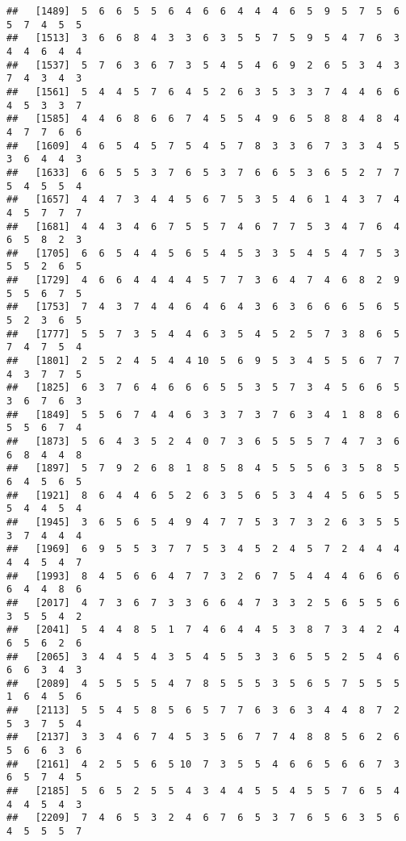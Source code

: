 \documentclass[
]{book}
\begin{document}
\begin{verbatim}
##   [1489]  5  6  6  5  5  6  4  6  6  4  4  4  6  5  9  5  7  5  6  5  7  4  5  5
##   [1513]  3  6  6  8  4  3  3  6  3  5  5  7  5  9  5  4  7  6  3  4  4  6  4  4
##   [1537]  5  7  6  3  6  7  3  5  4  5  4  6  9  2  6  5  3  4  3  7  4  3  4  3
##   [1561]  5  4  4  5  7  6  4  5  2  6  3  5  3  3  7  4  4  6  6  4  5  3  3  7
##   [1585]  4  4  6  8  6  6  7  4  5  5  4  9  6  5  8  8  4  8  4  4  7  7  6  6
##   [1609]  4  6  5  4  5  7  5  4  5  7  8  3  3  6  7  3  3  4  5  3  6  4  4  3
##   [1633]  6  6  5  5  3  7  6  5  3  7  6  6  5  3  6  5  2  7  7  5  4  5  5  4
##   [1657]  4  4  7  3  4  4  5  6  7  5  3  5  4  6  1  4  3  7  4  4  5  7  7  7
##   [1681]  4  4  3  4  6  7  5  5  7  4  6  7  7  5  3  4  7  6  4  6  5  8  2  3
##   [1705]  6  6  5  4  4  5  6  5  4  5  3  3  5  4  5  4  7  5  3  5  5  2  6  5
##   [1729]  4  6  6  4  4  4  4  5  7  7  3  6  4  7  4  6  8  2  9  5  5  6  7  5
##   [1753]  7  4  3  7  4  4  6  4  6  4  3  6  3  6  6  6  5  6  5  5  2  3  6  5
##   [1777]  5  5  7  3  5  4  4  6  3  5  4  5  2  5  7  3  8  6  5  7  4  7  5  4
##   [1801]  2  5  2  4  5  4  4 10  5  6  9  5  3  4  5  5  6  7  7  4  3  7  7  5
##   [1825]  6  3  7  6  4  6  6  6  5  5  3  5  7  3  4  5  6  6  5  3  6  7  6  3
##   [1849]  5  5  6  7  4  4  6  3  3  7  3  7  6  3  4  1  8  8  6  5  5  6  7  4
##   [1873]  5  6  4  3  5  2  4  0  7  3  6  5  5  5  7  4  7  3  6  6  8  4  4  8
##   [1897]  5  7  9  2  6  8  1  8  5  8  4  5  5  5  6  3  5  8  5  6  4  5  6  5
##   [1921]  8  6  4  4  6  5  2  6  3  5  6  5  3  4  4  5  6  5  5  5  4  4  5  4
##   [1945]  3  6  5  6  5  4  9  4  7  7  5  3  7  3  2  6  3  5  5  3  7  4  4  4
##   [1969]  6  9  5  5  3  7  7  5  3  4  5  2  4  5  7  2  4  4  4  4  4  5  4  7
##   [1993]  8  4  5  6  6  4  7  7  3  2  6  7  5  4  4  4  6  6  6  6  4  4  8  6
##   [2017]  4  7  3  6  7  3  3  6  6  4  7  3  3  2  5  6  5  5  6  3  5  5  4  2
##   [2041]  5  4  4  8  5  1  7  4  6  4  4  5  3  8  7  3  4  2  4  6  5  6  2  6
##   [2065]  3  4  4  5  4  3  5  4  5  5  3  3  6  5  5  2  5  4  6  6  6  3  4  3
##   [2089]  4  5  5  5  5  4  7  8  5  5  5  3  5  6  5  7  5  5  5  1  6  4  5  6
##   [2113]  5  5  4  5  8  5  6  5  7  7  6  3  6  3  4  4  8  7  2  5  3  7  5  4
##   [2137]  3  3  4  6  7  4  5  3  5  6  7  7  4  8  8  5  6  2  6  5  6  6  3  6
##   [2161]  4  2  5  5  6  5 10  7  3  5  5  4  6  6  5  6  6  7  3  6  5  7  4  5
##   [2185]  5  6  5  2  5  5  4  3  4  4  5  5  4  5  5  7  6  5  4  4  4  5  4  3
##   [2209]  7  4  6  5  3  2  4  6  7  6  5  3  7  6  5  6  3  5  6  4  5  5  5  7

\end{verbatim}
\end{document}

